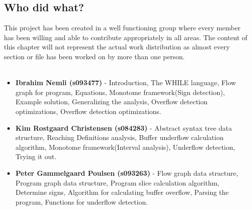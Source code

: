 \begin{appendices}
\chapter{Who did what?}
This project has been created in a well functioning group where every member has been willing and able to contribute appropriately in all areas. The content of this chapter will not represent the actual work distribution as almost every section or file has been worked on by more than one person.
\\\\
\begin{itemize}
	\item \textbf{Ibrahim Nemli (s093477)} - Introduction, The WHILE language, Flow graph for program, Equations, Monotome framework(Sign detection), Example solution, Generalizing the analysis, Overflow detection optimizations, Overflow detection optimizations.
	\item \textbf{Kim Rostgaard Christensen (s084283)} - Abstract syntax tree data structure, Reaching Definitions analysis, Buffer underflow calculation algorithm, Monotome framework(Interval analysis), Underflow detection, Trying it out.
	\item \textbf{Peter Gammelgaard Poulsen (s093263)} - Flow graph data structure, Program graph data structure, Program slice calculation algorithm, Determine signs, Algorithm for calculating buffer overflow, Parsing the program, Functions for underflow detection.
\end{itemize}

\end{appendices}
